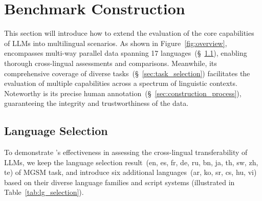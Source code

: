 \section{Benchmark Construction}
This section will introduce how to extend the evaluation of the core capabilities of LLMs into multilingual scenarios. As shown in Figure~\ref{fig:overview}, \name encompasses multi-way parallel data spanning 17 languages~(\S~\ref{sec:lg_selection}), enabling thorough cross-lingual assessments and comparisons. Meanwhile, its comprehensive coverage of diverse tasks~(\S~\ref{sec:task_selection}) facilitates the evaluation of multiple capabilities across a spectrum of linguistic contexts. Noteworthy is its precise human annotation~(\S~\ref{sec:construction_process}), guaranteeing the integrity and trustworthiness of the data.

\subsection{Language Selection}
\label{sec:lg_selection}

To demonstrate \name's effectiveness in assessing the cross-lingual transferability of LLMs, we keep the language selection result~(en, es, fr, de, ru, bn, ja, th, sw, zh, te) of MGSM task, and introduce six additional languages~(ar, ko, sr, cs, hu, vi) based on their diverse language families and script systems (illustrated in Table~\ref{tab:lg_selection}). 



